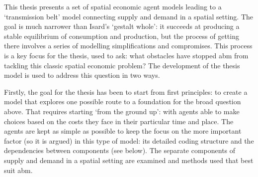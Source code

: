 This thesis presents a set of spatial economic agent models leading to a `transmission belt' model connecting supply and demand in a spatial setting. The goal is much narrower than Isard's `gestalt whole': it succeeds at producing a stable equilibrium of consumption and production, but the process of getting there involves a series of modelling simplifications and compromises. This process is a key focus for the thesis, used to ask: what obstacles have stopped \gls{abm} from tackling this classic spatial economic problem? The development of the thesis model is used to address this question in two ways.

Firstly, the goal for the thesis has been to start from first principles: to create a model that explores one possible route to a foundation for the broad question above. That requires starting `from the ground up': with agents able to make choices based on the costs they face in their particular time and place. The agents are kept as simple as possible to keep the focus on the more important factor (so it is argued) in this type of model: its detailed coding structure and the dependencies between components (see below). The separate components of supply and demand in a spatial setting are examined and methods used that best suit \gls{abm}. 

